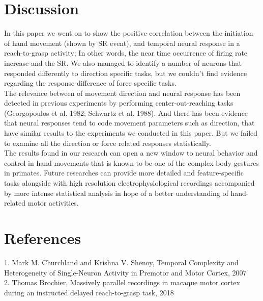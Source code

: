 \documentclass[9pt,twocolumn]{paper-template}
\begin{document}
\section*{Discussion}
In this paper we went on to show the positive correlation between the initiation of hand movement (shown by SR event), and temporal neural response in a reach-to-grasp activity; In other words, the near time occurrence of firing rate increase and the SR. We also managed to identify a number of neurons that responded differently to direction specific tasks, but we couldn’t find evidence regarding the response difference of force specific tasks.
\\
The relevance between of movement direction and neural response has been detected in previous experiments by performing center-out-reaching tasks (Georgopoulos et al. 1982; Schwartz et al. 1988). And there has been evidence that neural responses tend to code movement parameters such as direction, that have similar results to the experiments we conducted in this paper. But we failed to examine all the direction or force related responses statistically.
\\
The results found in our research can open a new window to neural behavior and control in hand movements that is known to be one of the complex body gestures in primates. Future researches can provide more detailed and feature-specific tasks alongside with high resolution electrophysiological recordings accompanied by more intense statistical analysis in hope of a better understanding of hand-related motor activities.


\showacknow{} %

\section*{References}
1. Mark M. Churchland and Krishna V. Shenoy, Temporal Complexity and Heterogeneity of Single-Neuron Activity in Premotor and Motor Cortex, 2007
\\
2. Thomas Brochier, Massively parallel recordings in macaque motor cortex during an instructed delayed reach-to-grasp task, 2018
\end{document}
